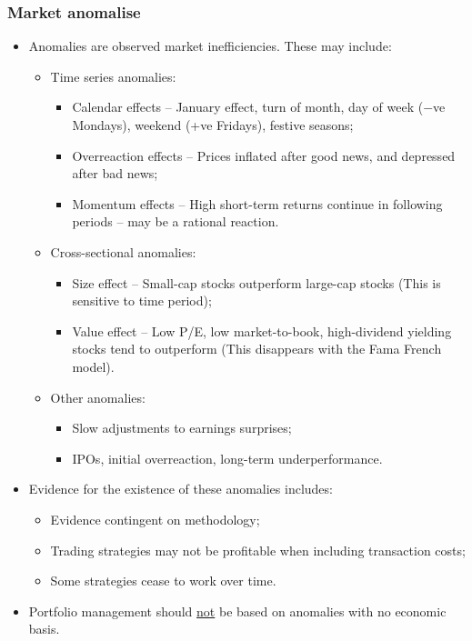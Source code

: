 \documentclass[../notes_compiled.tex]{subfiles}
\begin{document}
\subsubsection{Market anomalise}
\begin{itemize}
\item Anomalies are observed market inefficiencies. These may include:
\begin{itemize}
\item Time series anomalies:
\begin{itemize}
\item Calendar effects -- January effect, turn of month, day of week ($-$ve Mondays), weekend (+ve Fridays), festive seasons;
\item Overreaction effects -- Prices inflated after good news, and depressed after bad news;
\item Momentum effects -- High short-term returns continue in following periods -- may be a rational reaction.
\end{itemize}

\item Cross-sectional anomalies:
\begin{itemize}
\item Size effect -- Small-cap stocks outperform large-cap stocks (This is sensitive to time period);
\item Value effect -- Low P/E, low market-to-book, high-dividend yielding stocks tend to outperform (This disappears with the Fama French model).
\end{itemize}

\item Other anomalies:
\begin{itemize}
\item Slow adjustments to earnings surprises;
\item IPOs, initial overreaction, long-term underperformance.
\end{itemize}
\end{itemize}


\item Evidence for the existence of these anomalies includes:
\begin{itemize}
\item Evidence contingent on methodology;
\item Trading strategies may not be profitable when including transaction costs;
\item Some strategies cease to work over time.
\end{itemize}
\item Portfolio management should \underline{not} be based on anomalies with no economic basis.

\end{itemize}
\end{document}
